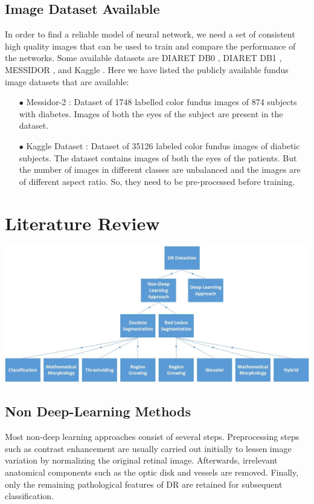 \documentclass[12pt]{report}
\begin{document}
\section{Image Dataset Available}
In order to find a reliable model of neural network, we need a set of consistent high
quality images that can be used to train and compare the performance of the networks. Some available datasets are DIARET DB0 \cite{kauppi2006diaretdb0}, DIARET DB1 \cite{kalviainen2007diaretdb1}, MESSIDOR \cite{decenciere_feedback_2014}, and Kaggle \cite{kaggle_data}. Here we have listed the publicly available fundus image datasets
that are available:
\begin{itemize}
	\item[$\bullet$] Messidor-2 \cite{decenciere_feedback_2014}: Dataset of 1748 labelled color fundus images of 874 subjects with diabetes. Images of both the eyes of the subject are present in the dataset.
	\item[$\bullet$] Kaggle Dataset \cite{kaggle_data}: Dataset of 35126 labeled color fundus images of diabetic subjects. The dataset contains images of both the eyes of the patients. But the number of images in different classes are unbalanced and the images are of
	different aspect ratio. So, they need to be pre-processed before training.
\end{itemize}

\chapter{Literature Review}
\includegraphics[width=1\textwidth]{Drawing1}

\section{Non Deep-Learning Methods}
Most non-deep learning approaches consist of several steps. Preprocessing steps such as contrast enhancement are usually carried out initially to lessen image variation by normalizing the original retinal image. Afterwards, irrelevant anatomical components such as the optic disk and vessels are removed. Finally, only the remaining pathological features of DR are retained for subsequent classification.
\end{document}
